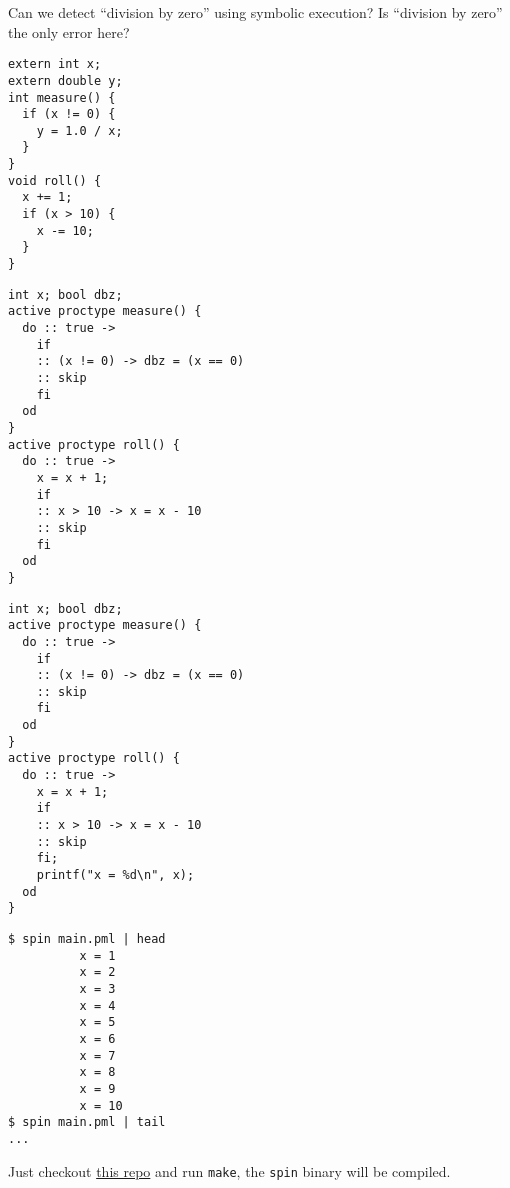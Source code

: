 \documentclass{article}
\begin{document}
Can we detect ``division by zero'' using symbolic execution? Is ``division by zero'' the only error here?

\plush{}


\begin{pptWide}{2}
{\small\begin{verbatim}
extern int x;
extern double y;
int measure() {
  if (x != 0) {
    y = 1.0 / x;
  }
}
void roll() {
  x += 1;
  if (x > 10) {
    x -= 10;
  }
}
\end{verbatim}
}
\par\columnbreak\par
{\scriptsize\begin{verbatim}
int x; bool dbz;
active proctype measure() {
  do :: true ->
    if
    :: (x != 0) -> dbz = (x == 0)
    :: skip
    fi
  od
}
active proctype roll() {
  do :: true ->
    x = x + 1;
    if
    :: x > 10 -> x = x - 10
    :: skip
    fi
  od
}
\end{verbatim}
}
\end{pptWide}

\plush{}


\begin{pptWide}{2}
{\scriptsize\begin{verbatim}
int x; bool dbz;
active proctype measure() {
  do :: true ->
    if
    :: (x != 0) -> dbz = (x == 0)
    :: skip
    fi
  od
}
active proctype roll() {
  do :: true ->
    x = x + 1;
    if
    :: x > 10 -> x = x - 10
    :: skip
    fi;
    printf("x = %d\n", x);
  od
}
\end{verbatim}
}
\par\columnbreak\par
{\scriptsize\begin{verbatim}
$ spin main.pml | head
          x = 1
          x = 2
          x = 3
          x = 4
          x = 5
          x = 6
          x = 7
          x = 8
          x = 9
          x = 10
$ spin main.pml | tail
...
\end{verbatim}
}

Just checkout \href{https://github.com/nimble-code/Spin}{this repo} and run \texttt{make},
the \texttt{spin} binary will be compiled.
\end{pptWide}

\plush{}

\end{document}
